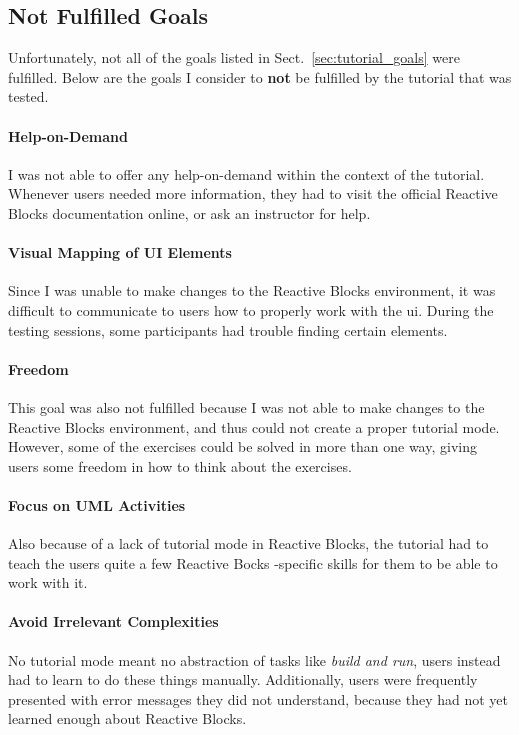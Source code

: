 \subsection{Not Fulfilled Goals}
\label{sec:tutorial_goals_not_fulfilled}
Unfortunately, not all of the goals listed in Sect.~\ref{sec:tutorial_goals} were fulfilled. Below are the goals I consider to \textbf{not} be fulfilled by the tutorial that was tested.

\paragraph{Help-on-Demand} I was not able to offer any help-on-demand within the context of the tutorial. Whenever users needed more information, they had to visit the official Reactive Blocks documentation online, or ask an instructor for help.

\paragraph{Visual Mapping of UI Elements} Since I was unable to make changes to the Reactive Blocks environment, it was difficult to communicate to users how to properly work with the \gls{ui}. During the testing sessions, some participants had trouble finding certain elements.

\paragraph{Freedom} This goal was also not fulfilled because I was not able to make changes to the Reactive Blocks environment, and thus could not create a proper tutorial mode. However, some of the exercises could be solved in more than one way, giving users some freedom in how to think about the exercises.

\paragraph{Focus on UML Activities} Also because of a lack of tutorial mode in Reactive Blocks, the tutorial had to teach the users quite a few Reactive Bocks -specific skills for them to be able to work with it.

\paragraph{Avoid Irrelevant Complexities} No tutorial mode meant no abstraction of tasks like \emph{build and run}, users instead had to learn to do these things manually. Additionally, users were frequently presented with error messages they did not understand, because they had not yet learned enough about Reactive Blocks.

